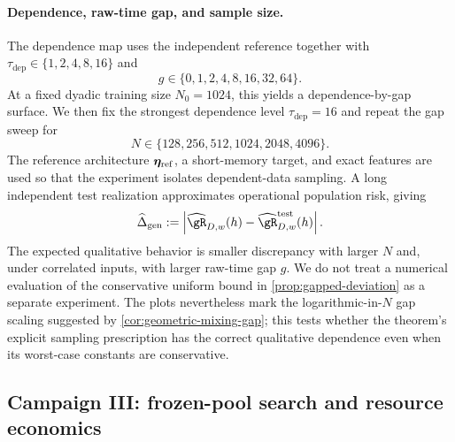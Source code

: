 \paragraph{Dependence, raw-time gap, and sample size.}
The dependence map uses the independent reference together with
$\tau_{\mathrm{dep}}\in\{1,2,4,8,16\}$ and
\begin{equation}
    g\in\{0,1,2,4,8,16,32,64\}.
    \label{eq:g-grid}
\end{equation}
At a fixed dyadic training size $N_0=1024$, this yields a dependence-by-gap
surface.  We then fix the strongest dependence level
$\tau_{\mathrm{dep}}=16$ and repeat the gap sweep for
\begin{equation}
    N\in\{128,256,512,1024,2048,4096\}.
    \label{eq:N-grid}
\end{equation}
The reference architecture $\bm{\eta}_{\mathrm{ref}}$, a short-memory target,
and exact features are used so that the experiment isolates dependent-data
sampling.  A long independent test realization
approximates operational population risk, giving
\begin{equation}
    \widehat\Delta_{\mathrm{gen}}
    :=\left|
       \widehat\risk_{D,w}(h)-
       \widehat\risk_{D,w}^{\mathrm{test}}(h)
      \right|.
    \label{eq:empirical-generalization-gap}
\end{equation}
The expected qualitative behavior is smaller discrepancy with larger $N$ and,
under correlated inputs, with larger raw-time gap $g$.  We do not treat a
numerical evaluation of the conservative uniform bound in
\cref{prop:gapped-deviation} as a separate experiment.  The plots nevertheless
mark the logarithmic-in-$N$ gap scaling suggested by
\cref{cor:geometric-mixing-gap}; this tests whether the theorem's explicit
sampling prescription has the correct qualitative dependence even when its
worst-case constants are conservative.

\subsection{Campaign III: frozen-pool search and resource economics}
\label{sec:empirical-frozen-search}

